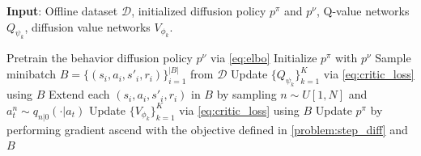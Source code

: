 \begin{algorithm}[t]
\caption{Behavior-Regularized Diffuion Policy Optimization (\texttt{BDPO})}
\label{code}
\textbf{Input}: Offline dataset $\mathcal{D}$, initialized diffusion policy $p^\pi$ and $p^\nu$, Q-value networks $Q_{\psi_k}$, diffusion value networks $V_{\phi_k}$.

\begin{algorithmic}[1]
\STATE Pretrain the behavior diffusion policy $p^\nu$ via \eqref{eq:elbo}
\STATE Initialize $p^\pi$ with $p^\nu$
\STATE Sample minibatch $B=\{(s_i, a_i, s'_i, r_i)\}_{i=1}^{|B|}$ from $\mathcal{D}$
\STATE Update $\{Q_{\psi_k}\}_{k=1}^K$ via \eqref{eq:critic_loss} using $B$
\STATE Extend each $(s_i,a_i,s'_i,r_i)$ in $B$ by sampling $n\sim U[1, N]$ and $a^{n}_t\sim q_{n|0}(\cdot|a_t)$
\STATE Update $\{V_{\phi_k}\}_{k=1}^K$ via \eqref{eq:critic_loss} using $B$
\STATE Update $p^\pi$ by performing gradient ascend with the objective defined in \eqref{problem:step_diff} and $B$
\ENDIF
\ENDFOR
\end{algorithmic}
\end{algorithm}